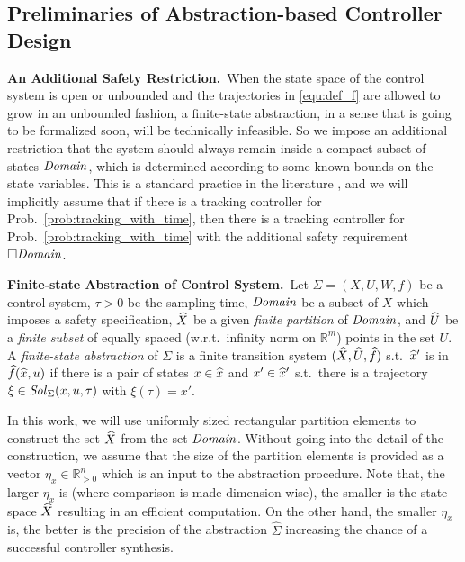 \subsection{Preliminaries of Abstraction-based Controller Design}

\smallskip
\noindent\textbf{An Additional Safety Restriction.}\
When the state space of the control system is open or unbounded and the trajectories in \eqref{equ:def_f} are allowed to grow in an unbounded fashion, a finite-state abstraction, in a sense that is going to be formalized soon, will be technically infeasible.
So we impose an additional restriction that the system should always remain inside a compact subset of states $\mathit{Domain}$, which is determined according to some known bounds on the state variables.
This is a standard practice in the literature \cite{reissig2016feedback}, and we will implicitly assume that if there is a tracking controller for Prob.~\ref{prob:tracking_with_time}, then there is a tracking controller for Prob.~\ref{prob:tracking_with_time} with the additional safety requirement $\square \mathit{Domain}$.
%

\smallskip
\noindent\textbf{Finite-state Abstraction of Control System.}\
Let $\Sigma = (X, U, W, f)$ be a control system, $\tau>0$ be the sampling time, $\mathit{Domain}$ be a subset of $X$ which imposes a safety specification, $\widehat{X}$ be a given \emph{finite partition} of $\mathit{Domain}$, and $\widehat{U}$ be a \emph{finite subset} of equally spaced (w.r.t.\ infinity norm on $\mathbb{R}^m$) points in the set $U$.
A \emph{finite-state abstraction} of $\Sigma$ is a finite transition system $(\widehat{X},\widehat{U},\widehat{f})$ s.t.\ $\widehat{x}'$ is in $\widehat{f}(\widehat{x},u)$ if there is a pair of states $x\in \widehat{x}$ and $x'\in \widehat{x}'$ s.t.\ there is a trajectory $\xi\in \mathit{Sol}_\Sigma(x,u,\tau)$ with $\xi(\tau)=x'$.

In this work, we will use uniformly sized rectangular partition elements to construct the set $\widehat{X}$ from the set $\mathit{Domain}$.
Without going into the detail of the construction, we assume that the size of the partition elements is provided as a vector $\eta_x\in \mathbb{R}^n_{>0}$ which is an input to the abstraction procedure.
Note that, the larger $\eta_x$ is (where comparison is made dimension-wise), the smaller is the state space $\widehat{X}$ resulting in an efficient computation.
On the other hand, the smaller $\eta_x$ is, the better is the precision of the abstraction $\widehat{\Sigma}$ increasing the chance of a successful controller synthesis.

